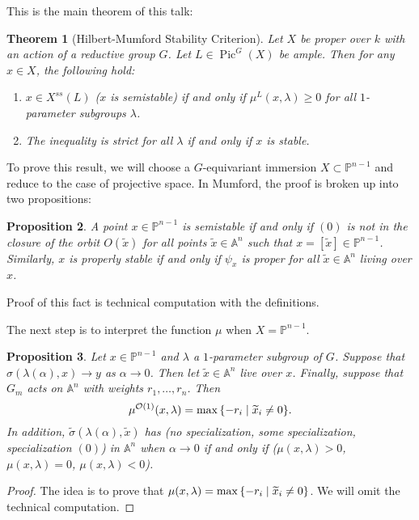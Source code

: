 \documentclass[leqno, openany]{memoir}
\newtheorem{thm}{Theorem}[section]
\newtheorem{prop}[thm]{Proposition}
\theoremstyle{definition}
\theoremstyle{remark}
\theoremstyle{plain}
\theoremstyle{definition}
\theoremstyle{remark}
\newcommand{\A}{\mathbb{A}}
\renewcommand{\P}{\mathbb{P}}
\newcommand{\mc}[1]{\mathcal{#1}}
\newcommand{\wt}[1]{\widetilde{#1}}
\DeclareMathOperator{\Pic}{Pic}
\begin{document}
This is the main theorem of this talk: \begin{thm}[Hilbert-Mumford Stability
    Criterion] Let $X$ be proper over $k$ with an action of a reductive group
    $G$. Let $L \in \Pic^G(X)$ be ample. Then for any $x \in X$, the following
    hold: \begin{enumerate} \item $x \in X^{ss}(L)$ ($x$ is semistable) if and
    only if $\mu^L(x, \lambda) \geq 0$ for all $1$-parameter subgroups
    $\lambda$.  \item The inequality is strict for all $\lambda$ if and only if
    $x$ is stable.  \end{enumerate} \end{thm}

To prove this result, we will choose a $G$-equivariant immersion $X \subset
\P^{n-1}$ and reduce to the case of projective space. In Mumford, the proof is
broken up into two propositions:

\begin{prop} A point $x \in \P^{n-1}$ is semistable if and only if $(0)$ is not
    in the closure of the orbit $O(\wt{x})$ for all points $\wt{x} \in \A^n$
    such that $x = [\wt{x}] \in \P^{n-1}$. Similarly, $x$ is properly stable if
    and only if $\psi_x$ is proper for all $\wt{x} \in \A^n$ living over $x$.
\end{prop}

Proof of this fact is technical computation with the definitions.

The next step is to interpret the function $\mu$ when $X = \P^{n-1}$.
\begin{prop} Let $x \in \P^{n-1}$ and $\lambda$ a $1$-parameter subgroup of
    $G$. Suppose that $\sigma(\lambda(\alpha), x) \to y$ as $\alpha \to 0$.
    Then let $\wt{x} \in \A^n$ live over $x$. Finally, suppose that $G_m$ acts
    on $\A^n$ with weights $r_1, \ldots, r_n$. Then \[ \mu^{\mc{O}(1)}(x,
    \lambda) = \max \qty{-r_i \mid \wt{x}_i \neq 0}. \] In addition,
    $\wt{\sigma}(\lambda(\alpha),\wt{x})$ has (no specialization, some
    specialization, specialization $(0)$) in $\A^n$ when $\alpha \to 0$ if and
    only if ($\mu(x, \lambda) > 0$, $\mu(x, \lambda) = 0$, $\mu(x, \lambda) <
    0$).  \end{prop}

\begin{proof} The idea is to prove that $\mu(x, \lambda) = \max \qty{-r_i \mid
\wt{x}_i \neq 0}$. We will omit the technical computation.  \end{proof}
\end{document}
